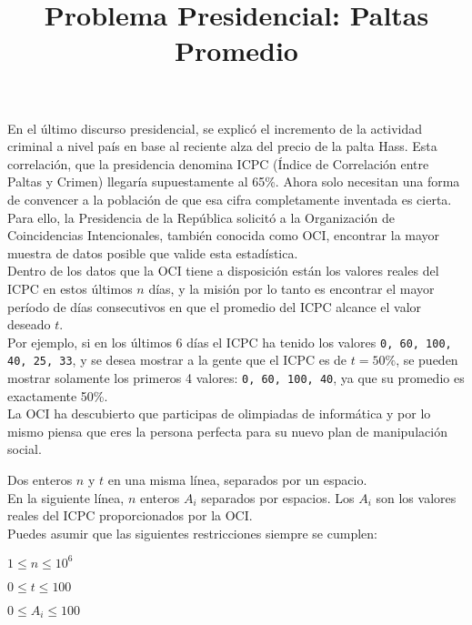 \documentclass{oci}
\title{Problema Presidencial: Paltas Promedio}
\begin{document}
\begin{problemDescription}
En el último discurso presidencial, se explicó el incremento de la actividad criminal a nivel país en base al reciente alza del precio de la palta Hass. Esta correlación, que la presidencia denomina ICPC (Índice de Correlación entre Paltas y Crimen) llegaría supuestamente al 65\%. Ahora solo necesitan una forma de convencer a la población de que esa cifra completamente inventada es cierta.\\

\noindent Para ello, la Presidencia de la República solicitó a la Organización de Coincidencias Intencionales, también conocida como OCI, encontrar la mayor muestra de datos posible que valide esta estadística.\\

\noindent Dentro de los datos que la OCI tiene a disposición están los valores reales del ICPC en estos últimos $n$ días, y la misión por lo tanto es encontrar el mayor período de días consecutivos en que el promedio del ICPC alcance el valor deseado $t$.\\

\noindent Por ejemplo, si en los últimos 6 días el ICPC ha tenido los valores \texttt{0, 60, 100, 40, 25, 33}, y se desea mostrar a la gente que el ICPC es de $t=50\%$, se pueden mostrar solamente los primeros 4 valores: \texttt{0, 60, 100, 40}, ya que su promedio es exactamente 50\%.\\

\noindent La OCI ha descubierto que participas de olimpiadas de informática y por lo mismo piensa que eres la persona perfecta para su nuevo plan de manipulación social.\\
\end{problemDescription}

\begin{inputDescription}
\noindent Dos enteros $n$ y $t$ en una misma línea, separados por un espacio.\\

\noindent En la siguiente línea, $n$ enteros $A_i$ separados por espacios.
Los $A_i$ son los valores reales del ICPC proporcionados por la OCI.\\

\noindent Puedes asumir que las siguientes restricciones siempre se cumplen:

$1 \le n \le 10^6$

$0 \le t \le 100$

$0 \le A_i \le 100$
\end{inputDescription}
\end{document}
